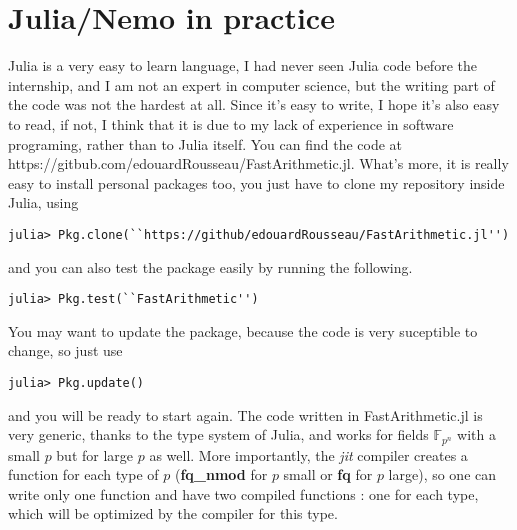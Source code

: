 \documentclass[a4paper,11pt]{article}
\theoremstyle{break}
\theoremstyle{definition}
\theoremstyle{remark}
\begin{document}
\section{Julia/Nemo in practice}
Julia is a very easy to learn language, I had never seen Julia code before the internship, and I am not an expert in computer science, but the writing part of the code was not the hardest at all. Since it's easy to write, I hope it's also easy to read, if not, I think that it is due to my lack of experience in software programing, rather than to Julia itself. You can find the code at https://gitbub.com/edouardRousseau/FastArithmetic.jl. What's more, it is really easy to install personal packages too, you just have to clone my repository inside Julia, using
\begin{verbatim}
julia> Pkg.clone(``https://github/edouardRousseau/FastArithmetic.jl'') 
\end{verbatim}
and you can also test the package easily by running the following.
\begin{verbatim}
julia> Pkg.test(``FastArithmetic'') 
\end{verbatim}
You may want to update the package, because the code is very suceptible to change, so just use
\begin{verbatim}
julia> Pkg.update()
\end{verbatim}
and you will be ready to start again. The code written in FastArithmetic.jl is very generic, thanks to the type system of Julia, and works for fields $\mathbb{F}_{p^n}$ with a small $p$ but for large $p$ as well. More importantly, the \emph{jit} compiler creates a function for each type of $p$ (\textbf{fq\_nmod} for $p$ small or \textbf{fq} for $p$ large), so one can write only one function and have two compiled functions : one for each type, which will be optimized by the compiler for this type.

\clearpage


\end{document}
